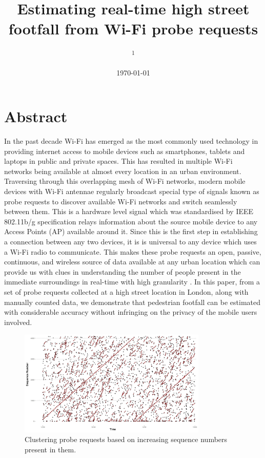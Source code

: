 \documentclass[11t, a4paper, twocolumn]{article}
\title{Estimating real-time high street footfall from Wi-Fi probe requests}
\author{
	\authorstyle{
		Balamurugan Soundararaj\textsuperscript{1}, 
		James Cheshire\textsuperscript{1} and 
		Paul Longley\textsuperscript{1}}
	\newline\newline
	\textsuperscript{1}\institution{
		Department of Geography, 
		University College London, 
		United Kingdom}
}
\date{\today}
\begin{document}
	\maketitle
	\thispagestyle{firstpage}

	\section{Abstract}

	In the past decade Wi-Fi has emerged as the most
	commonly used technology in providing 
	internet access to mobile devices such as smartphones, tablets
	and laptops in public and private spaces.
	This has resulted in multiple Wi-Fi networks being available at
	almost every location in an urban environment.
	Traversing through this overlapping mesh of Wi-Fi networks,
	modern mobile devices with Wi-Fi antennae regularly
	broadcast special type of signals known as probe requests to
	discover available Wi-Fi networks and switch seamlessly
	between them.
	This is a hardware level signal which was standardised by IEEE 802.11b/g
	specification relays information about the source mobile device to
	any Access Points (AP) available around it.
	Since this is the first step in establishing
	a connection between any two devices, it is
	is universal to any device which uses a Wi-Fi radio to communicate.
	This makes these probe requests
	an open, passive, continuous, and wireless source of
	data available at any urban location which can provide us with clues in
	understanding the number of people present in the immediate surroundings
	in real-time with high granularity \citep{freud2015,konto2017}.
	In this paper, from a set of probe requests collected
	at a high street location in London,
	along with manually counted data, we demonstrate
	that pedestrian footfall can be estimated with considerable accuracy without
	infringing on the privacy of the mobile users involved.

	\begin{figure}
		\begin{center}
			\includegraphics[width=0.8\textwidth]{outputs/clustering_1.png}
			\caption{Clustering probe requests based on increasing sequence
			numbers present in them.}
		\end{center}
	\end{figure}
\end{document}
